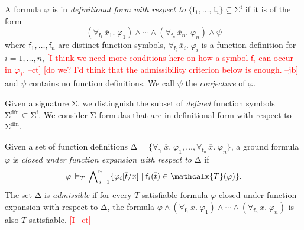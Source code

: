 \documentclass[runningheads,a4paper]{llncs}
\renewcommand\models{\mathrel{\vDash}}
\newcommand\DDD{\Delta}
\newcommand{\con}[1]{\mathsf{#1}}
\renewcommand\vec[1]{\overline{#1}}
\let\oldSigma=\Sigma
\def\Sigma{\mathrm{\oldSigma}}
\let\oldDelta=\Delta
\def\Delta{\mathrm{\oldDelta}}
\let\oldwedge=\wedge
\def\wedge{\mathrel{\oldwedge}}
\newcommand{\terms}{\mathcalx{T}}
\newcommand{\sfuns}[1]{#1^\mathrm{f}}
\newcommand{\sfundefs}[1]{#1^\mathrm{dfn}}
\newcommand{\forallf}[1]{\forall_{\!#1\:}}
\newcommand{\rem}[1]{\textcolor{red}{[#1]}}
\newcommand{\jb}[1]{\rem{#1 --jb}}
\newcommand{\ct}[1]{\rem{#1 --ct}}
\begin{document}
\begin{definition}\rm
A formula $\varphi$ is in \emph{definitional form with respect to}
$\{ \con{f}_1, \ldots, \con{f}_n \} \subseteq \sfuns{\Sigma}$ if it is of the
form
%
%
\[(\forallf{\con{f}_1} \vec x_1.\; \varphi_1) \wedge \cdots \wedge
(\forallf{\con{f}_n} \vec x_n.\; \varphi_n) \wedge \psi\]
%
where $\con{f}_1, \ldots, \con{f}_n$ are distinct function symbols,
$\forallf{\con{f}_i} \vec x_i.\; \varphi_i$ is a function definition
for $i = 1, \ldots, n$,
%
\ct{I think we need more conditions here on how a symbol $\con{f}_i$ can occur in $\varphi_j$.}
\jb{do we? I'd think that the admissibility criterion below is enough.}
and $\psi$ contains no function definitions.
We call $\psi$ the \emph{conjecture} of $\varphi$.
\end{definition}

Given a signature $\Sigma$, we distinguish the subset of \emph{defined}
function symbols $\sfundefs{\Sigma} \subseteq \sfuns{\Sigma}$.
We consider $\Sigma$-formulas that are in definitional form with respect to
$\sfundefs{\Sigma}$.

\begin{definition}\rm
Given a set of function definitions 
$\DDD = \{ \forallf{\con{f}_1} \vec x.\; \varphi_1, \ldots, \forallf{\con{f}_n} \vec x.\; \varphi_n \}$, 
a ground formula $\varphi$ 
is \emph{closed under function expansion with respect to $\DDD$} if 
\[
 \varphi \,\models_T\, \bigwedge\nolimits_{\,i=1}^{n} \{ \varphi_i[ \vec t / \vec x ] \mid \con{f}_i( \vec t ) \in \terms( \varphi ) \} .
\]
The set $\DDD$ is \emph{admissible} if for every $T$-satisfiable formula 
$\varphi$ closed under function expansion with respect to $\DDD$,
the formula
$\varphi \wedge (\forallf{\con{f}_1} \vec x.\; \varphi_1) \wedge \cdots \wedge (\forallf{\con{f}_n} \vec x.\; \varphi_n)$ is also $T$-satisfiable.
\ct{I}
\end{definition}
\end{document}

